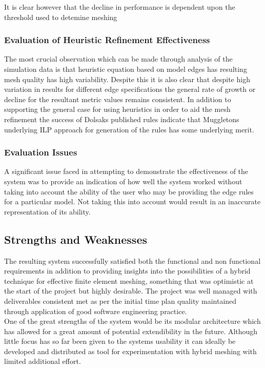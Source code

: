 It is clear however that the decline in performance is dependent upon the threshold used to detemine meshing

\subsubsection{Evaluation of Heuristic Refinement Effectiveness}
The most crucial observation which can be made through analysis of the simulation data is that heuristic equation based on model edges has resulting mesh quality has high variability. Despite this it is also clear that despite high variation in results for different edge specifications the general rate of growth or decline for the resultant metric values remains consistent. In addition to supporting the general case for using heuristics in order to aid the mesh refinement the success of Dolsaks published rules indicate that Muggletons underlying ILP approach for generation of the rules has some underlying merit. \\ 

\subsubsection{Evaluation Issues}
A significant issue faced in attempting to demonstrate the effectiveness of the system was to provide an indication of how well the system worked without taking into account the ability of the user who may be providing the edge rules for a particular model. Not taking this into account would result in an inaccurate representation of its ability.

\subsection{Strengths and Weaknesses}
The resulting system successfully satisfied both the functional and non functional requirements in addition to providing insights into the possibilities of a hybrid technique for effective finite element meshing, something that was optimistic at the start of the project but highly desirable. The project was well managed with deliverables consistent met as per the initial time plan quality maintained through application of good software engineering practice. \\
 


\noindent
One of the great strengths of the system would be its modular architecture which has allowed for a great amount of potential extendibility in the future. Although little focus has so far been given to the systems usability it can ideally be developed and distributed as tool for experimentation with hybrid meshing with limited additional effort. \\

